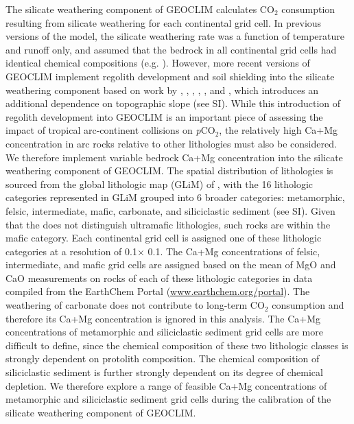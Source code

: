 \documentclass[11pt,letterpaper]{article}
\newcommand{\degrees}{\textdegree\xspace}
\newcommand{\pCOtwo}{\textit{p}CO$_{2}$\xspace}
\newcommand{\COtwo}{CO$_{2}$\xspace}
\begin{document}
The silicate weathering component of GEOCLIM calculates \COtwo consumption resulting from silicate weathering for each continental grid cell. In previous versions of the model, the silicate weathering rate was a function of temperature and runoff only, and assumed that the bedrock in all continental grid cells had identical chemical compositions (e.g. \citealp{Godderis2014a}). However, more recent versions of GEOCLIM implement regolith development and soil shielding into the silicate weathering component based on work by \citet{Heimsath1997a}, \citet{Gabet2009a}, \citet{West2012a}, \citet{Carretier2014a}, \citet{Godderis2017b}, and \citet{Maffre2018a}, which introduces an additional dependence on topographic slope (see SI). While this introduction of regolith development into GEOCLIM is an important piece of assessing the impact of tropical arc-continent collisions on \pCOtwo, the relatively high Ca+Mg concentration in arc rocks relative to other lithologies must also be considered. We therefore implement variable bedrock Ca+Mg concentration into the silicate weathering component of GEOCLIM. The spatial distribution of lithologies is sourced from the global lithologic map (GLiM) of \citet{Hartmann2012a}, with the 16 lithologic categories represented in GLiM grouped into 6 broader categories: metamorphic, felsic, intermediate, mafic, carbonate, and siliciclastic sediment (see SI). Given that the \citet{Hartmann2012a} does not distinguish ultramafic lithologies, such rocks are within the mafic category.  Each continental grid cell is assigned one of these lithologic categories at a resolution of 0.1\degrees $\times$ 0.1\degrees. The Ca+Mg concentrations of felsic, intermediate, and mafic grid cells are assigned based on the mean of MgO and CaO measurements on rocks of each of these lithologic categories in data compiled from the EarthChem Portal (\url{www.earthchem.org/portal}). The weathering of carbonate does not contribute to long-term \COtwo consumption and therefore its Ca+Mg concentration is ignored in this analysis. The Ca+Mg concentrations of metamorphic and siliciclastic sediment grid cells are more difficult to define, since the chemical composition of these two lithologic classes is strongly dependent on protolith composition. The chemical composition of siliciclastic sediment is further strongly dependent on its degree of chemical depletion. We therefore explore a range of feasible Ca+Mg concentrations of metamorphic and siliciclastic sediment grid cells during the calibration of the silicate weathering component of GEOCLIM.
\end{document}
